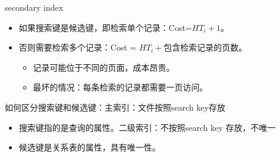 \documentclass[b5paper, twoside]{article}
\newenvironment{smallmdframed}
  {\begin{mdframed}[linewidth=0pt, backgroundcolor=pink!20]\small}
  {\end{mdframed}}
\begin{document}
\begin{itemize}
{	secondary index}
	\begin{itemize}
		\item 如果搜索键是候选键，即检索单个记录：Cost=$HT_i+1$。
		\item 否则需要检索多个记录：Cost = $HT_i+\text{包含检索记录的页数}$。
		\begin{itemize}
			\item 记录可能位于不同的页面，成本昂贵。
			\item 最坏的情况：每条检索的记录都需要一页访问。
		\end{itemize}
	\end{itemize}
\begin{smallmdframed}
	如何区分搜索键和候选键：\hfill 主索引：文件按照search key存放
	\begin{itemize}
		\item 搜索键指的是查询的属性。\hfill 二级索引：不按照search key 存放，不唯一
		\item 候选键是关系表的属性，具有唯一性。
	\end{itemize}


\end{smallmdframed}
\end{itemize}
\end{document}
